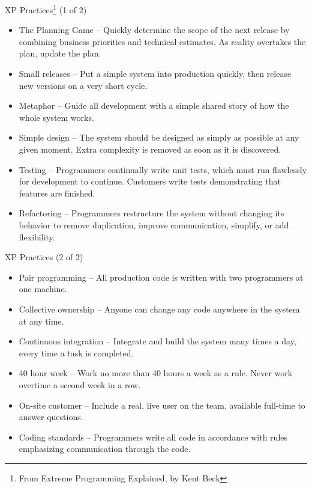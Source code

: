 \documentclass{beamer}
\begin{document}
\begin{frame}[fragile]{XP Practices\footnote{From Extreme Programming Explained, by Kent Beck} (1 of 2)}


\begin{itemize}
\item The Planning Game -- Quickly determine the scope of the next release by combining business priorities and technical estimates. As reality overtakes the plan, update the plan.
\item Small releases -- Put a simple system into production quickly, then release new versions on a very short cycle.
\item Metaphor -- Guide all development with a simple shared story of how the whole system works.
\item Simple design -- The system should be designed as simply as possible at any given moment. Extra complexity is removed as soon as it is discovered.
\item Testing -- Programmers continually write unit tests, which must run flawlessly for development to continue. Customers write tests demonstrating that features are finished.
\item Refactoring -- Programmers restructure the system without changing its behavior to remove duplication, improve communication, simplify, or add flexibility.
\end{itemize}


\end{frame}

\begin{frame}[fragile]{XP Practices (2 of 2)}


\begin{itemize}
\item Pair programming -- All production code is written with two programmers at one machine.
\item Collective ownership -- Anyone can change any code anywhere in the system at any time.
\item Continuous integration -- Integrate and build the system many times a day, every time a task is completed.
\item 40 hour week -- Work no more than 40 hours a week as a rule. Never work overtime a second week in a row.
\item On-site customer -- Include a real, live user on the team, available full-time to answer questions.
\item Coding standards -- Programmers write all code in accordance with rules emphasizing communication through the code.
\end{itemize}


\end{frame}
\end{document}
